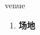
\begin{frame}
{\huge venue}
\begin{center}
\begin{enumerate}\Large
  \item \textbf{场地}
\end{enumerate}
\end{center}
\end{frame}
